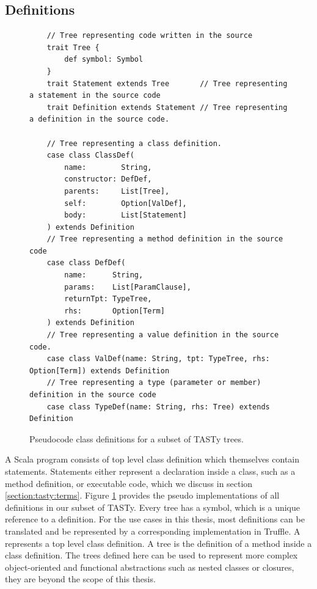 \subsection{Definitions}

\begin{figure}[!htb]
	\begin{verbatim}
	// Tree representing code written in the source
	trait Tree {
		def symbol: Symbol
	}                         
	trait Statement extends Tree       // Tree representing a statement in the source code
	trait Definition extends Statement // Tree representing a definition in the source code.
		
	// Tree representing a class definition.
	case class ClassDef(
		name:        String,
		constructor: DefDef, 
		parents:     List[Tree], 
		self:        Option[ValDef], 
		body:        List[Statement]
	) extends Definition
	// Tree representing a method definition in the source code
	case class DefDef(
		name:      String, 
		params:    List[ParamClause], 
		returnTpt: TypeTree, 
		rhs:       Option[Term]
	) extends Definition
	// Tree representing a value definition in the source code.
	case class ValDef(name: String, tpt: TypeTree, rhs: Option[Term]) extends Definition
	// Tree representing a type (parameter or member) definition in the source code
	case class TypeDef(name: String, rhs: Tree) extends Definition
	\end{verbatim} 
	\caption{Pseudocode class definitions for a subset of TASTy trees.}
	\label{tasty:defs}
\end{figure}

A Scala program consists of top level class definition which themselves contain statements.
Statements either represent a declaration inside a class, such as a method definition, or executable code, which we discuss in section \ref{section:tasty:terms}.
Figure \ref{tasty:defs} provides the pseudo implementations of all definitions in our subset of TASTy.
Every tree has a symbol, which is a unique reference to a definition.
For the use cases in this thesis, most definitions can be translated and be represented by a corresponding implementation in Truffle.
A  represents a top level class definition.
A  tree is the definition of a method inside a class definition.
The trees defined here can be used to represent more complex object-oriented and functional abstractions such as nested classes or closures, they are beyond the scope of this thesis.


